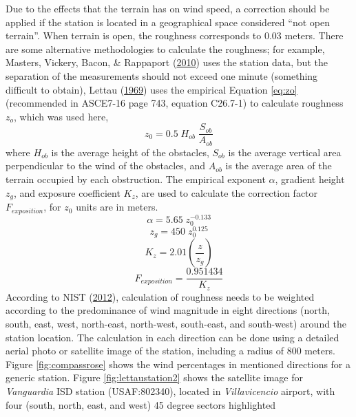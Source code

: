 \documentclass[12pt,oneside]{reedthesis}
\begin{document}
Due to the effects that the terrain has on wind speed, a correction should be applied if the station is located in a geographical space considered ``not open terrain''. When terrain is open, the roughness corresponds to 0.03 meters. There are some alternative methodologies to calculate the roughness; for example, Masters, Vickery, Bacon, \& Rappaport (\protect\hyperlink{ref-Masters2010}{2010}) uses the station data, but the separation of the measurements should not exceed one minute (something difficult to obtain), Lettau (\protect\hyperlink{ref-Lettau1969}{1969}) uses the empirical Equation \eqref{eq:zo} (recommended in ASCE7-16 page 743, equation C26.7-1) to calculate roughness \(z_o\), which was used here,
\begin{equation}
        z_0= 0.5\;H_{ob}\;\frac{S_{ob}}{A_{ob}}
  \label{eq:zo}
\end{equation}
where \(H_{ob}\) is the average height of the obstacles, \(S_{ob}\) is the average vertical area perpendicular to the wind of the obstacles, and \(A_{ob}\) is the average area of the terrain occupied by each obstruction. The empirical exponent \(\alpha\), gradient height \(z_g\), and exposure coefficient \(K_z\), are used to calculate the correction factor \(F_{exposition}\), for \(z_0\) units are in meters.
\begin{equation}
        \alpha =  5.65\;z_0^{-0.133}
  \label{eq:alpha}
\end{equation}
\begin{equation}
        z_g=450\;z_0^{0.125}
  \label{eq:zg}
\end{equation}
\begin{equation}
        K_z= 2.01\left(\frac{z}{z_g}\right)
  \label{eq:kz}
\end{equation}
\begin{equation}
        F_{exposition} = \frac{0.951434}{K_z}
  \label{eq:fexpo}
\end{equation}
According to NIST (\protect\hyperlink{ref-nist2012}{2012}), calculation of roughness needs to be weighted according to the predominance of wind magnitude in eight directions (north, south, east, west, north-east, north-west, south-east, and south-west) around the station location. The calculation in each direction can be done using a detailed aerial photo or satellite image of the station, including a radius of 800 meters. Figure \ref{fig:compassrose} shows the wind percentages in mentioned directions for a generic station. Figure \ref{fig:lettaustation2} shows the satellite image for \emph{Vanguardia} ISD station (USAF:802340), located in \emph{Villavicencio} airport, with four (south, north, east, and west) 45 degree sectors highlighted
\end{document}
